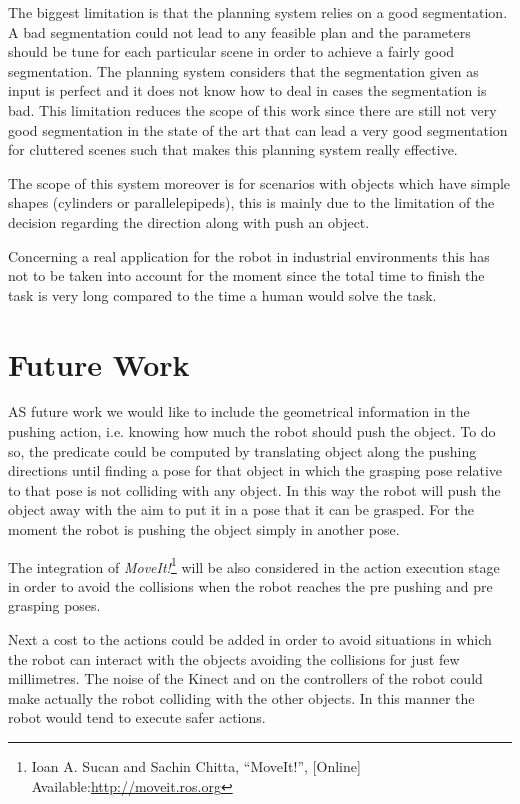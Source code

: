 The biggest limitation is that the planning system relies on a good segmentation. A bad segmentation could not lead to any feasible plan and the parameters should be tune for each particular scene in order to achieve a fairly good segmentation. The planning system considers that the segmentation given as input is perfect and it does not know how to deal in cases the segmentation is bad. This limitation reduces the scope of this work since there are still not very good segmentation in the state of the art that can lead a very good segmentation for cluttered scenes such that makes this planning system really effective. 

The scope of this system moreover is for scenarios with objects which have simple shapes (cylinders or parallelepipeds), this is mainly due to the limitation of the decision regarding the direction along with push an object.  

Concerning a real application for the robot in industrial environments this has not to be taken into account for the moment since the total time to finish the task is very long compared to the time a human would solve the task.

\section*{Future Work}
AS future work we would like to include the geometrical information in the pushing action, i.e. knowing how much the robot should push the object. To do so, the  predicate could be computed by translating object along the pushing directions until finding a pose for that object in which the grasping pose relative to that pose is not colliding with any object. In this way the robot will push the object away with the aim to put it in a pose that it can be grasped. For the moment the robot is pushing the object simply in another pose. 

The integration of \textit{MoveIt!}\footnote{Ioan A. Sucan and Sachin Chitta, “MoveIt!”, [Online] Available:\href{http://moveit.ros.org} {\url{http://moveit.ros.org}}} will be also considered in the action execution stage in order to avoid the collisions when the robot reaches the pre pushing and pre grasping poses. 

Next a cost to the actions could be added in order to avoid situations in which the robot can interact with the objects avoiding the collisions for just few millimetres. The noise of the Kinect and on the controllers of the robot could make actually the robot colliding with the other objects. In this manner the robot would tend to execute safer actions. 